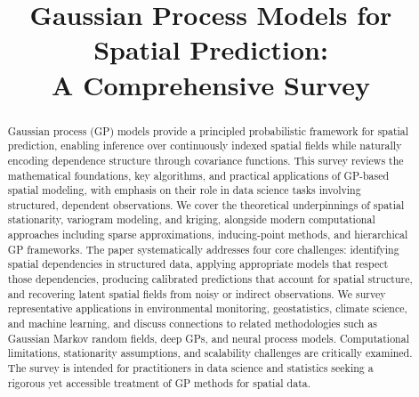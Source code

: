 \documentclass[conference]{IEEEtran}
\begin{document}
\title{Gaussian Process Models for Spatial Prediction:\\
A Comprehensive Survey}

\author{
\and
{}
}

\maketitle

\begin{abstract}
Gaussian process (GP) models provide a principled probabilistic framework for spatial prediction, enabling inference over continuously indexed spatial fields while naturally encoding dependence structure through covariance functions. This survey reviews the mathematical foundations, key algorithms, and practical applications of GP-based spatial modeling, with emphasis on their role in data science tasks involving structured, dependent observations. We cover the theoretical underpinnings of spatial stationarity, variogram modeling, and kriging, alongside modern computational approaches including sparse approximations, inducing-point methods, and hierarchical GP frameworks. The paper systematically addresses four core challenges: identifying spatial dependencies in structured data, applying appropriate models that respect those dependencies, producing calibrated predictions that account for spatial structure, and recovering latent spatial fields from noisy or indirect observations. We survey representative applications in environmental monitoring, geostatistics, climate science, and machine learning, and discuss connections to related methodologies such as Gaussian Markov random fields, deep GPs, and neural process models. Computational limitations, stationarity assumptions, and scalability challenges are critically examined. The survey is intended for practitioners in data science and statistics seeking a rigorous yet accessible treatment of GP methods for spatial data.
\end{abstract}
\end{document}
